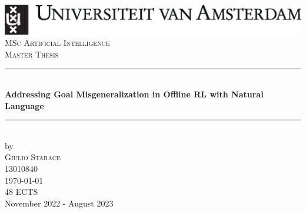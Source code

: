 \documentclass[../main.tex]{subfiles}
\begin{document}
\begin{titlepage}
    \newcommand{\HRule}{\rule{\linewidth}{0.5mm}} %
    \center %


    \includegraphics[width=\textwidth]{logos/uvalogo_regular_p_nl.eps}\\
    \vfill
    \textsc{\Large MSc Artificial Intelligence}\\[0.2cm]
    \textsc{\Large Master Thesis}\\[0.5cm]


    \HRule \\[0.4cm]
    { \huge \bfseries Addressing Goal Misgeneralization in Offline RL with Natural Language} %
    \HRule \\[0.5cm]


    by\\[0.2cm]
    \textsc{\Large Giulio Starace}\\[0.2cm] %
    13010840\\[1cm]


    {\Large \today}\\[1cm] %

    48 ECTS\\ %
    November 2022 - August 2023\\[1cm]%


\end{titlepage}
\end{document}
